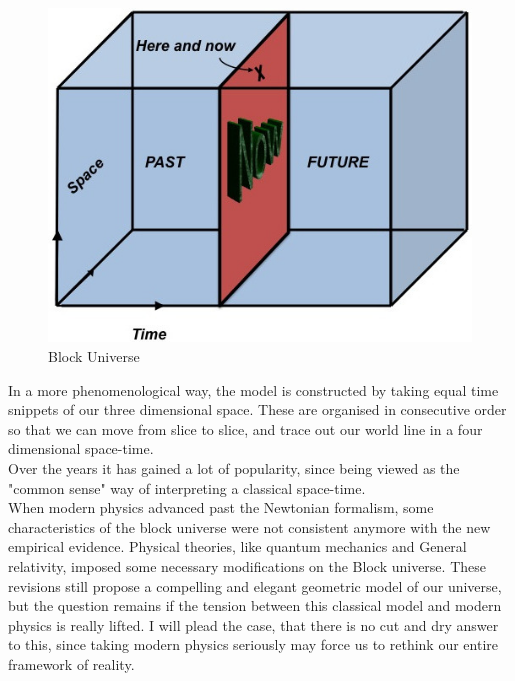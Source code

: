 \documentclass[11pt, a4 paper]{article}
\begin{document}
\begin{multicols}{2}
\begin{figure}
\includegraphics[width=\linewidth]{block.jpeg}
\caption{Block Universe \cite{picblock}}
\label{fig:1}
\end{figure}
In a more phenomenological way, the model is constructed by taking equal time snippets of our three dimensional space. These are organised in consecutive order so that we can move from slice to slice, and trace out our world line in a four dimensional space-time.\\  Over the years it has gained a lot of popularity, since being viewed as the "common sense" way of interpreting a classical space-time.\\
When modern physics advanced past the Newtonian formalism, some characteristics of the block universe were not consistent anymore with the new empirical evidence. Physical theories, like quantum mechanics and General relativity, imposed some necessary modifications on the Block universe. These revisions still propose a compelling and elegant geometric model of our universe, but the question remains if the tension between this classical model and modern physics is really lifted. I will plead the case, that there is no cut and dry answer to this, since taking modern physics seriously may force us to rethink our entire framework of reality. 
\end{multicols}
\end{document}

